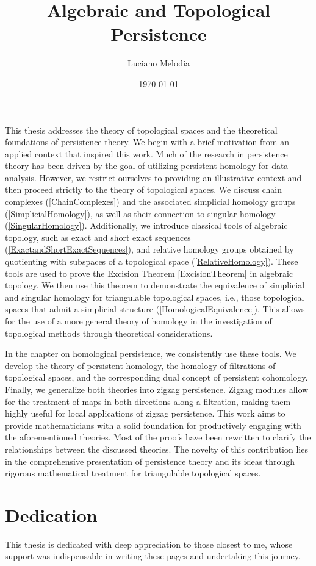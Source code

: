 \documentclass[b5paper, 12pt, twoside]{report}
\title{Algebraic and Topological Persistence}
\author{Luciano Melodia}
\date{\today}
\begin{document}
	
	
	This thesis addresses the theory of topological spaces and the theoretical foundations
	of persistence theory. We begin with a brief motivation from an applied
	context that inspired this work. Much of the research in persistence theory has
	been driven by the goal of utilizing persistent homology for data analysis.
	However, we restrict ourselves to providing an illustrative context and then proceed
	strictly to the theory of topological spaces. We discuss chain complexes (\ref{ChainComplexes})
	and the associated simplicial homology groups (\ref{SimplicialHomology}), as well
	as their connection to singular homology (\ref{SingularHomology}).
	Additionally, we introduce classical tools of algebraic topology, such as
	exact and short exact sequences (\ref{ExactandShortExactSequences}), and relative
	homology groups obtained by quotienting with subspaces of a topological space (\ref{RelativeHomology}).
	These tools are used to prove the Excision Theorem \ref{ExcisionTheorem} in
	algebraic topology. We then use this theorem to demonstrate the equivalence of
	simplicial and singular homology for triangulable topological spaces, i.e.,
	those topological spaces that admit a simplicial structure (\ref{HomologicalEquivalence}).
	This allows for the use of a more general theory of homology in the investigation
	of topological methods through theoretical considerations.

	In the chapter on homological persistence, we consistently use these tools. We
	develop the theory of persistent homology, the homology of filtrations of
	topological spaces, and the corresponding dual concept of persistent cohomology.
	Finally, we generalize both theories into zigzag persistence. Zigzag modules
	allow for the treatment of maps in both directions along a filtration, making them
	highly useful for local applications of zigzag persistence. This work aims to
	provide mathematicians with a solid foundation for productively engaging with
	the aforementioned theories. Most of the proofs have been rewritten to clarify
	the relationships between the discussed theories. The novelty of this
	contribution lies in the comprehensive presentation of persistence theory and
	its ideas through rigorous mathematical treatment for triangulable topological
	spaces.
	\chapter*{Dedication}

	This thesis is dedicated with deep appreciation to those closest to me, whose
	support was indispensable in writing these pages and undertaking this journey.
\end{document}
